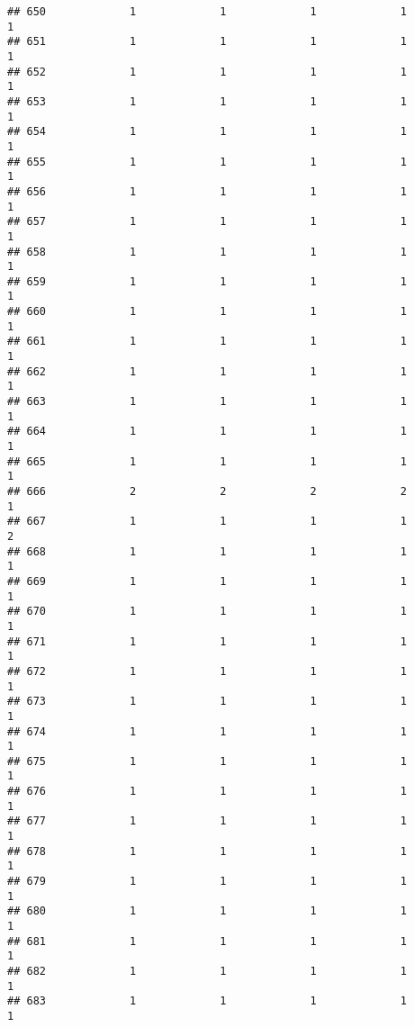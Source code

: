 \documentclass[
]{article}
\begin{document}
\begin{verbatim}
## 650             1             1             1             1             1
## 651             1             1             1             1             1
## 652             1             1             1             1             1
## 653             1             1             1             1             1
## 654             1             1             1             1             1
## 655             1             1             1             1             1
## 656             1             1             1             1             1
## 657             1             1             1             1             1
## 658             1             1             1             1             1
## 659             1             1             1             1             1
## 660             1             1             1             1             1
## 661             1             1             1             1             1
## 662             1             1             1             1             1
## 663             1             1             1             1             1
## 664             1             1             1             1             1
## 665             1             1             1             1             1
## 666             2             2             2             2             1
## 667             1             1             1             1             2
## 668             1             1             1             1             1
## 669             1             1             1             1             1
## 670             1             1             1             1             1
## 671             1             1             1             1             1
## 672             1             1             1             1             1
## 673             1             1             1             1             1
## 674             1             1             1             1             1
## 675             1             1             1             1             1
## 676             1             1             1             1             1
## 677             1             1             1             1             1
## 678             1             1             1             1             1
## 679             1             1             1             1             1
## 680             1             1             1             1             1
## 681             1             1             1             1             1
## 682             1             1             1             1             1
## 683             1             1             1             1             1

\end{verbatim}
\end{document}
